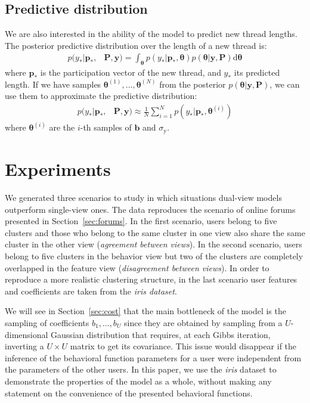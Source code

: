 \documentclass[smallextended]{svjour3}          %
\begin{document}
\subsection{Predictive distribution}
We are also interested in the ability of the model to predict new thread lengths. The posterior predictive distribution over the length of a new thread is:
\begin{align}
p(y_* | \mathbf{p_*}, & \mathbf{P}, \mathbf{y}) =
\int_{\boldsymbol{\theta}} 
p(y_* | \mathbf{p_*}, \boldsymbol{\theta})
p(\boldsymbol{\theta} | \mathbf{y}, \mathbf{P}) \text{d}\boldsymbol{\theta}
\end{align}
where $\mathbf{p_*}$ is the participation vector of the new thread, and $y_*$ its predicted length.
If we have samples $\boldsymbol{\theta}^{(1)},...,\boldsymbol{\theta}^{(N)}$ from the posterior $p(\boldsymbol{\theta}| \mathbf{y}, \mathbf{P})$, we can use them to approximate the predictive distribution:
\begin{align}
p(y_* | \mathbf{p_*}, & \mathbf{P}, \mathbf{y}) 
\approx
\frac{1}{N}
\sum_{i=1}^N
p(y_* | \mathbf{p_*}, \boldsymbol{\theta}^{(i)})
\label{eq:predictive_posterior_approx}
\end{align}
where $\boldsymbol{\theta}^{(i)}$ are the $i$-th samples of $\mathbf{b}$ and $\sigma_\text{y}$.


\section{Experiments}\label{sec:experiments}
We generated three scenarios to study in which situations dual-view models outperform single-view ones. The data reproduces the scenario of online forums presented in Section~\ref{sec:forums}. In the first scenario, users belong to five clusters and those who belong to the same cluster in one view also share the same cluster in the other view (\textit{agreement between views}). In the second scenario, users belong to five clusters in the behavior view but two of the clusters are completely overlapped in the feature view (\textit{disagreement between views}). In order to reproduce a more realistic clustering structure, in the last scenario user features and coefficients are taken from the \textit{iris dataset}. 

We will see in Section~\ref{sec:cost} that the main bottleneck of the model is the sampling of coefficients $b_1,...,b_U$ since they are obtained by sampling from a $U$-dimensional Gaussian distribution that requires, at each Gibbs iteration, inverting a $U\times U$ matrix to get its covariance. This issue would disappear if the inference of the behavioral function parameters for a user were independent from the parameters of the other users. In this paper, we use the \textit{iris} dataset to demonstrate the properties of the model as a whole, without making any statement on the convenience of the presented behavioral functions.
\end{document}
